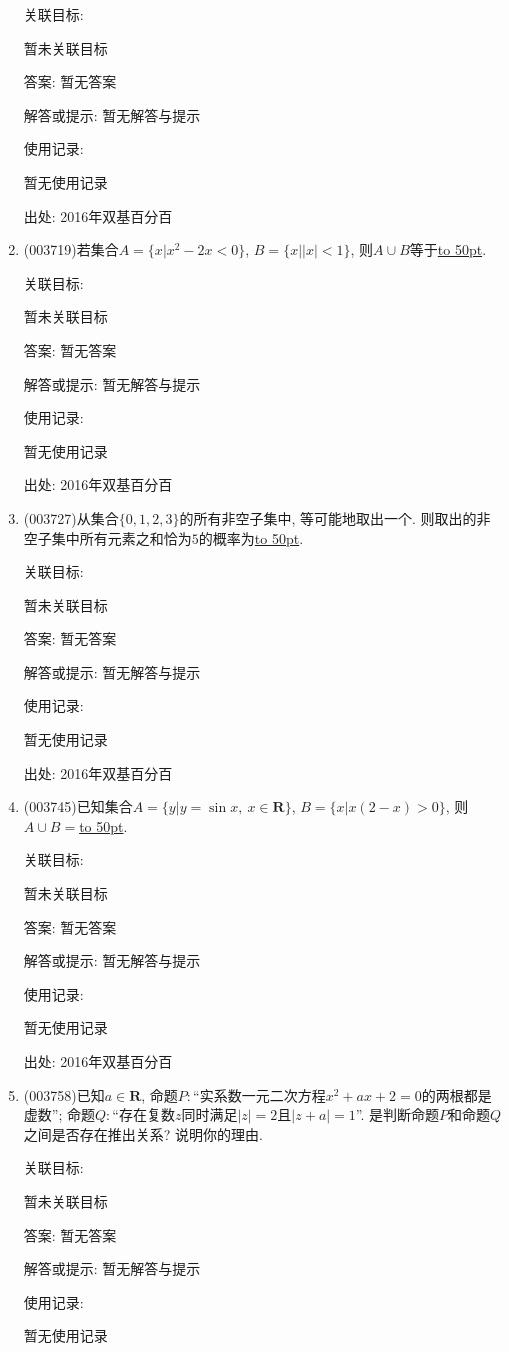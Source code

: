 \documentclass[10pt,a4paper]{article}
\newcommand{\blank}[1]{\underline{\hbox to #1pt{}}}
\begin{document}
\begin{enumerate}[1.]
关联目标:

暂未关联目标

答案: 暂无答案

解答或提示: 暂无解答与提示

使用记录:

暂无使用记录


出处: 2016年双基百分百
\item { (003719)}若集合$A=\{x|x^2-2x<0\}$, $B=\{x||x|<1\}$, 则$A\cup B$等于\blank{50}.


关联目标:

暂未关联目标

答案: 暂无答案

解答或提示: 暂无解答与提示

使用记录:

暂无使用记录


出处: 2016年双基百分百
\item { (003727)}从集合$\{0,1,2,3\}$的所有非空子集中, 等可能地取出一个. 则取出的非空子集中所有元素之和恰为$5$的概率为\blank{50}.


关联目标:

暂未关联目标

答案: 暂无答案

解答或提示: 暂无解答与提示

使用记录:

暂无使用记录


出处: 2016年双基百分百
\item { (003745)}已知集合$A=\{y|y=\sin x, \ x\in \mathbf{R}\}$, $B=\{x|x(2-x)>0\}$, 则$A\cup B=$\blank{50}.


关联目标:

暂未关联目标

答案: 暂无答案

解答或提示: 暂无解答与提示

使用记录:

暂无使用记录


出处: 2016年双基百分百
\item { (003758)}已知$a\in\mathbf{R}$, 命题$P:$``实系数一元二次方程$x^2+ax+2=0$的两根都是虚数''; 命题$Q:$``存在复数$z$同时满足$|z|=2$且$|z+a|=1$''.
是判断命题$P$和命题$Q$之间是否存在推出关系? 说明你的理由.


关联目标:

暂未关联目标

答案: 暂无答案

解答或提示: 暂无解答与提示

使用记录:

暂无使用记录



\end{enumerate}
\end{document}
